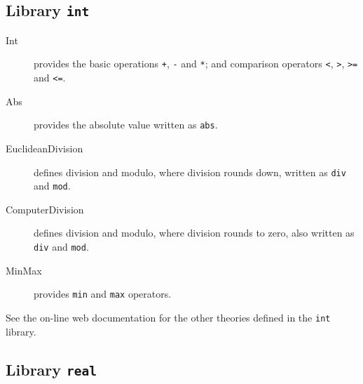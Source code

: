 \subsection{Library \texttt{int}}

\begin{description}

\item[Int] provides the basic operations \verb|+|, \verb|-| and
  \verb|*|; and comparison operators \verb|<|, \verb|>|, \verb|>=| and
  \verb|<=|.

\item[Abs] provides the absolute value written as \verb|abs|.

\item[EuclideanDivision] defines division and modulo, where division rounds
  down, written as \verb|div| and \verb|mod|.

\item[ComputerDivision] defines division and modulo, where division rounds to
  zero, also written as \verb|div| and \verb|mod|.

\item[MinMax] provides \verb|min| and \verb|max| operators.

\end{description}

See the on-line web documentation for the other theories defined in the
\texttt{int} library.

\subsection{Library \texttt{real}}

